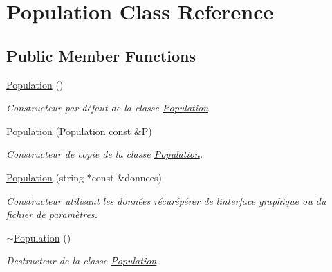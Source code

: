\hypertarget{class_population}{}\section{Population Class Reference}
\label{class_population}
\subsection*{Public Member Functions}
\begin{DoxyCompactItemize}
\item 
\mbox{\label{class_population_a54eb24ca89470eebe0c27bcb03a0ceae}} 
\hyperlink{class_population_a54eb24ca89470eebe0c27bcb03a0ceae}{Population} ()
\begin{DoxyCompactList}\small\item\em Constructeur par défaut de la classe \hyperlink{class_population}{Population}. \end{DoxyCompactList}\item 
\hyperlink{class_population_afb8bfdf1315ba757c6e616e3dcb7c0bb}{Population} (\hyperlink{class_population}{Population} const \&P)
\begin{DoxyCompactList}\small\item\em Constructeur de copie de la classe \hyperlink{class_population}{Population}. \end{DoxyCompactList}\item 
\mbox{\label{class_population_ab59130d62b27514555a07cea55896561}} 
\hyperlink{class_population_ab59130d62b27514555a07cea55896561}{Population} (string $\ast$const \&donnees)
\begin{DoxyCompactList}\small\item\em Constructeur utilisant les données récurépérer de l\textquotesingle{}interface graphique ou du fichier de paramètres. \end{DoxyCompactList}\item 
\mbox{\label{class_population_a4c8cedd0f038e41746fb6084639f5616}} 
\hyperlink{class_population_a4c8cedd0f038e41746fb6084639f5616}{$\sim$\+Population} ()
\begin{DoxyCompactList}\small\item\em Destructeur de la classe \hyperlink{class_population}{Population}. \end{DoxyCompactList}\item 

\end{DoxyCompactItemize}
